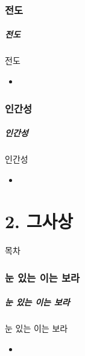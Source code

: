 \documentclass[aspectratio=1610,17pt,xcolor=pdftex,dvipsnames,table,handout]{beamer}
\begin{document}
		\section{ 전도 }
		\begin{frame} [t,plain]
		\frametitle{		전도	}	
			\begin{block} { 		전도	}
			\setlength{\leftmargini}{6em}			
			\begin{itemize}
				\item 
			\end{itemize}
			\end{block}						
								
		\end{frame}						

		\section{ 인간성 }
		\begin{frame} [t,plain]
		\frametitle{		인간성	}	
			\begin{block} { 		인간성	}
			\setlength{\leftmargini}{6em}			
			\begin{itemize}
				\item 
			\end{itemize}
			\end{block}						
								
		\end{frame}						





			

		\part{ 2. 그사상 }
		\frame{\partpage}
		
		\begin{frame} [plain]{목차}
		\tableofcontents%
		\end{frame}
		

		\section{				눈 있는 이는 보라	}
		\begin{frame} [t,plain]					
		\frametitle{			눈 있는 이는 보라	}
			\begin{block} { 		눈 있는 이는 보라	}
			\setlength{\leftmargini}{2em}			
			\begin{itemize}
				\item 
			\end{itemize}
			\end{block}						
								
		\end{frame}						
\end{document}
